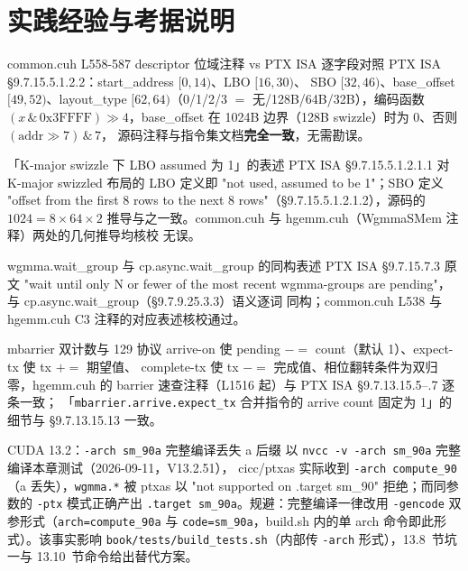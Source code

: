 \section{实践经验与考据说明}

\begin{kaogu}[F2 核校通过]{common.cuh L558-587 descriptor 位域注释 vs PTX ISA}
  逐字段对照 PTX ISA §9.7.15.5.1.2.2：start\_address $[0,14)$、LBO $[16,30)$、
  SBO $[32,46)$、base\_offset $[49,52)$、layout\_type $[62,64)$（0/1/2/3 $=$
  无/128B/64B/32B），编码函数 $(x \,\&\, \mathrm{0x3FFFF}) \gg 4$，base\_offset
  在 1024B 边界（128B swizzle）时为 0、否则 $(\mathrm{addr} \gg 7) \,\&\, 7$，
  源码注释与指令集文档\textbf{完全一致}，无需勘误。
\end{kaogu}

\begin{kaogu}[F2 核校通过]{「K-major swizzle 下 LBO assumed 为 1」的表述}
  PTX ISA §9.7.15.5.1.2.1.1 对 K-major swizzled 布局的 LBO 定义即
  "not used, assumed to be 1"；SBO 定义 "offset from the first 8 rows to the
  next 8 rows"（§9.7.15.5.1.2.1.2），源码的 $1024 = 8 \times 64 \times 2$
  推导与之一致。common.cuh 与 hgemm.cuh（WgmmaSMem 注释）两处的几何推导均核校
  无误。
\end{kaogu}

\begin{kaogu}[F2 核校通过]{wgmma.wait\_group 与 cp.async.wait\_group 的同构表述}
  PTX ISA §9.7.15.7.3 原文 "wait until only N or fewer of the most recent
  wgmma-groups are pending"，与 cp.async.wait\_group（§9.7.9.25.3.3）语义逐词
  同构；common.cuh L538 与 hgemm.cuh C3 注释的对应表述核校通过。
\end{kaogu}

\begin{kaogu}[F2 核校通过]{mbarrier 双计数与 129 协议}
  arrive-on 使 pending $-=$ count（默认 1）、expect-tx 使 tx $+=$ 期望值、
  complete-tx 使 tx $-=$ 完成值、相位翻转条件为双归零，hgemm.cuh 的
  barrier 速查注释（L1516 起）与 PTX ISA §9.7.13.15.5--.7 逐条一致；
  「\texttt{mbarrier.\allowbreak{}arrive.\allowbreak{}expect\_\allowbreak{}tx} 合并指令的 arrive count 固定为 1」的
  细节与 §9.7.13.15.13 一致。
\end{kaogu}

\begin{kaogu}[F1·工具链实测]{CUDA 13.2：\texttt{-arch sm\_90a} 完整编译丢失 a 后缀}
  以 \texttt{nvcc -v -arch sm\_90a} 完整编译本章测试（2026-09-11，V13.2.51），
  cicc/ptxas 实际收到 \texttt{-arch compute\_90}（a 丢失），\texttt{wgmma.*}
  被 ptxas 以 "not supported on .target sm\_90" 拒绝；而同参数的 \texttt{-ptx}
  模式正确产出 \texttt{.target sm\_90a}。规避：完整编译一律改用
  \texttt{-gencode} 双参形式（\texttt{arch=\allowbreak{}compute\_\allowbreak{}90a} 与
  \texttt{code=sm\_90a}，build.sh 内的单 arch 命令即此形式）。该事实影响 \texttt{book/\allowbreak{}tests/\allowbreak{}build\_\allowbreak{}tests.\allowbreak{}sh}（内部传 \texttt{-arch}
  形式），13.8~节坑一与 13.10~节命令给出替代方案。
\end{kaogu}

